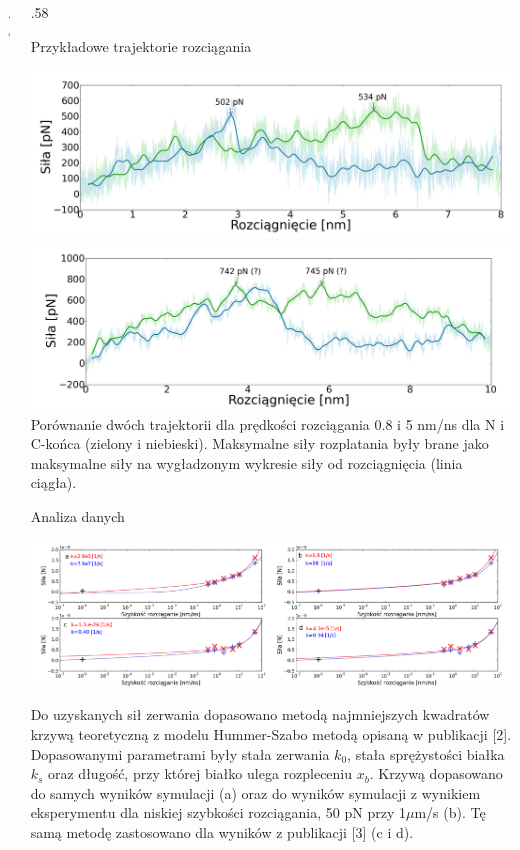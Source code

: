 \documentclass[final, t]{beamer} %
\begin{document}
\begin{frame}{}
\begin{columns}[T]
\begin{column} {.4\textwidth}
    \end{column}
    \begin{column} {.58\textwidth}
        \begin{block}{Przykładowe trajektorie rozciągania}\vspace{10mm}
        \centering
         \begin{minipage}{0.97\textwidth}
       \includegraphics[width=0.49\linewidth]{pull.png}
        \includegraphics[width=0.49\linewidth]{pull2.png}\\
        Porównanie dwóch trajektorii dla prędkości rozciągania 0.8 i 5 nm/ns dla N i C-końca (zielony i niebieski). Maksymalne siły rozplatania były brane jako maksymalne siły na wygładzonym wykresie siły od rozciągnięcia (linia ciągła).
        \end{minipage}\vspace{10mm}
        \end{block}
        
          \begin{block}{Analiza danych}\vspace{10mm}
          \centering
         \begin{minipage}{0.97\textwidth}

       \includegraphics[width=\linewidth]{anal3.png}

Do uzyskanych sił zerwania dopasowano metodą najmniejszych kwadratów krzywą teoretyczną z modelu Hummer-Szabo metodą opisaną w publikacji [2]. Dopasowanymi parametrami były stała zerwania $k_{0}$, stała sprężystości białka $k_{s}$ oraz długość, przy której białko ulega rozpleceniu $x_{b}$. Krzywą dopasowano do samych wyników symulacji (a) oraz do wyników symulacji z wynikiem eksperymentu dla niskiej szybkości rozciągania, 50 pN przy 1$\mu$m/s (b). Tę samą metodę zastosowano dla wyników z publikacji [3] (c i d).
\vfill
\end{minipage}\vspace{10mm}
        \end{block}


\end{column}
\end{columns}
\end{frame}
\end{document}
